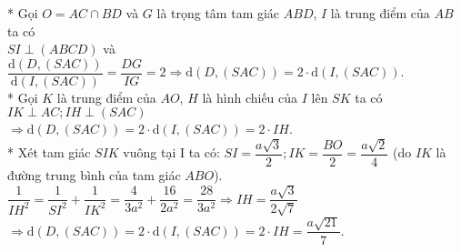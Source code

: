 \begin{ex}
{\begin{center}
		\end{center}
		
		* Gọi $O=AC\cap BD$ và $G$ là trọng tâm tam giác $ABD$, $I$ là trung điểm của $AB$ ta có\\
		$SI\perp(ABCD)$ và $\dfrac{\mathrm{d}\left(D,(SAC)\right)}{\mathrm{d}\left(I,(SAC)\right)}=\dfrac{DG}{IG}=2\Rightarrow\mathrm{d}\left(D,(SAC)\right)=2\cdot\mathrm{d}\left(I,(SAC)\right)$.\\
		* Gọi $K$ là trung điểm của $AO$, $H$ là hình chiếu của $I$ lên $SK$ ta có $IK\perp AC; IH\perp(SAC)$ \\
		$ \Rightarrow\mathrm{d}\left(D,(SAC)\right)=2\cdot\mathrm{d}\left(I,(SAC)\right)=2\cdot IH $.\\
		* Xét tam giác $SIK$ vuông tại I ta có: $SI=\dfrac{a\sqrt{3}}{2}; IK=\dfrac{BO}{2}=\dfrac{a\sqrt{2}}{4}$ (do $IK$ là đường trung bình của tam giác $ABO$).\\
		$\dfrac{1}{IH^2}=\dfrac{1}{SI^2}+\dfrac{1}{IK^2}=\dfrac{4}{3a^2}+\dfrac{16}{2a^2}=\dfrac{28}{3a^2}\Rightarrow IH=\dfrac{a\sqrt{3}}{2\sqrt{7}}$ \\
		$ \Rightarrow\mathrm{d}\left(D,(SAC)\right)=2\cdot\mathrm{d}\left(I,(SAC)\right)=2\cdot IH=\dfrac{a\sqrt{21}}{7} $.}
\end{ex}

